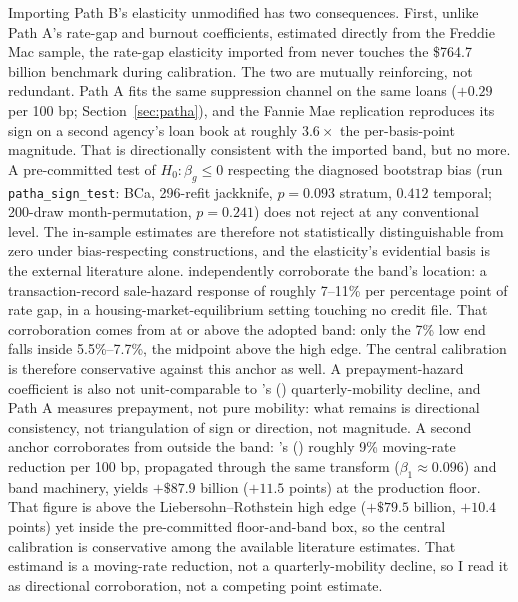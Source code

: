 \documentclass[12pt]{article}
\newcommand{\citepos}[1]{\citeauthor{#1}'s (\citeyear{#1})}
\begin{document}
Importing Path B's elasticity unmodified has two consequences. First, unlike Path A's rate-gap and burnout coefficients, estimated directly from the Freddie Mac sample, the rate-gap elasticity imported from \citet{liebersohn2024} never touches the \$764.7 billion benchmark during calibration. The two are mutually reinforcing, not redundant. Path A fits the same suppression channel on the same loans ($+0.29$ per 100 bp; Section~\ref{sec:patha}), and the Fannie Mae replication reproduces its sign on a second agency's loan book at roughly $3.6\times$ the per-basis-point magnitude. That is directionally consistent with the imported band, but no more. A pre-committed test of $H_0\!: \beta_g \le 0$ respecting the diagnosed bootstrap bias (run \texttt{patha\_sign\_test}: BCa, 296-refit jackknife, $p = 0.093$ stratum, $0.412$ temporal; 200-draw month-permutation, $p = 0.241$) does not reject at any conventional level. The in-sample estimates are therefore not statistically distinguishable from zero under bias-respecting constructions, and the elasticity's evidential basis is the external literature alone. \citet{graybill2026} independently corroborate the band's location: a transaction-record sale-hazard response of roughly 7--11\% per percentage point of rate gap, in a housing-market-equilibrium setting touching no credit file. That corroboration comes from at or above the adopted band: only the 7\% low end falls inside 5.5\%--7.7\%, the midpoint above the high edge. The central calibration is therefore conservative against this anchor as well. A prepayment-hazard coefficient is also not unit-comparable to \citepos{liebersohn2024} quarterly-mobility decline, and Path A measures prepayment, not pure mobility: what remains is directional consistency, not triangulation of sign or direction, not magnitude. A second anchor corroborates from outside the band: \citepos{fonseca2024} roughly 9\% moving-rate reduction per 100 bp, propagated through the same transform ($\beta_1 \approx 0.096$) and band machinery, yields $+\$87.9$ billion ($+11.5$ points) at the production floor. That figure is above the Liebersohn--Rothstein high edge ($+\$79.5$ billion, $+10.4$ points) yet inside the pre-committed floor-and-band box, so the central calibration is conservative among the available literature estimates. That estimand is a moving-rate reduction, not a quarterly-mobility decline, so I read it as directional corroboration, not a competing point estimate.
\end{document}
